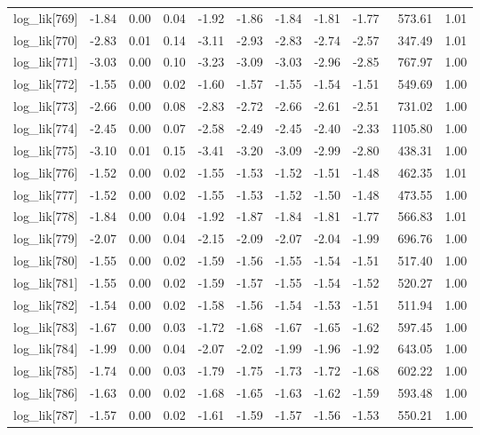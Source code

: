 \begin{table}[ht]
\begin{tabular}{rrrrrrrrrrr}
  log\_lik[769] & -1.84 & 0.00 & 0.04 & -1.92 & -1.86 & -1.84 & -1.81 & -1.77 & 573.61 & 1.01 \\ 
  log\_lik[770] & -2.83 & 0.01 & 0.14 & -3.11 & -2.93 & -2.83 & -2.74 & -2.57 & 347.49 & 1.01 \\ 
  log\_lik[771] & -3.03 & 0.00 & 0.10 & -3.23 & -3.09 & -3.03 & -2.96 & -2.85 & 767.97 & 1.00 \\ 
  log\_lik[772] & -1.55 & 0.00 & 0.02 & -1.60 & -1.57 & -1.55 & -1.54 & -1.51 & 549.69 & 1.00 \\ 
  log\_lik[773] & -2.66 & 0.00 & 0.08 & -2.83 & -2.72 & -2.66 & -2.61 & -2.51 & 731.02 & 1.00 \\ 
  log\_lik[774] & -2.45 & 0.00 & 0.07 & -2.58 & -2.49 & -2.45 & -2.40 & -2.33 & 1105.80 & 1.00 \\ 
  log\_lik[775] & -3.10 & 0.01 & 0.15 & -3.41 & -3.20 & -3.09 & -2.99 & -2.80 & 438.31 & 1.00 \\ 
  log\_lik[776] & -1.52 & 0.00 & 0.02 & -1.55 & -1.53 & -1.52 & -1.51 & -1.48 & 462.35 & 1.01 \\ 
  log\_lik[777] & -1.52 & 0.00 & 0.02 & -1.55 & -1.53 & -1.52 & -1.50 & -1.48 & 473.55 & 1.00 \\ 
  log\_lik[778] & -1.84 & 0.00 & 0.04 & -1.92 & -1.87 & -1.84 & -1.81 & -1.77 & 566.83 & 1.01 \\ 
  log\_lik[779] & -2.07 & 0.00 & 0.04 & -2.15 & -2.09 & -2.07 & -2.04 & -1.99 & 696.76 & 1.00 \\ 
  log\_lik[780] & -1.55 & 0.00 & 0.02 & -1.59 & -1.56 & -1.55 & -1.54 & -1.51 & 517.40 & 1.00 \\ 
  log\_lik[781] & -1.55 & 0.00 & 0.02 & -1.59 & -1.57 & -1.55 & -1.54 & -1.52 & 520.27 & 1.00 \\ 
  log\_lik[782] & -1.54 & 0.00 & 0.02 & -1.58 & -1.56 & -1.54 & -1.53 & -1.51 & 511.94 & 1.00 \\ 
  log\_lik[783] & -1.67 & 0.00 & 0.03 & -1.72 & -1.68 & -1.67 & -1.65 & -1.62 & 597.45 & 1.00 \\ 
  log\_lik[784] & -1.99 & 0.00 & 0.04 & -2.07 & -2.02 & -1.99 & -1.96 & -1.92 & 643.05 & 1.00 \\ 
  log\_lik[785] & -1.74 & 0.00 & 0.03 & -1.79 & -1.75 & -1.73 & -1.72 & -1.68 & 602.22 & 1.00 \\ 
  log\_lik[786] & -1.63 & 0.00 & 0.02 & -1.68 & -1.65 & -1.63 & -1.62 & -1.59 & 593.48 & 1.00 \\ 
  log\_lik[787] & -1.57 & 0.00 & 0.02 & -1.61 & -1.59 & -1.57 & -1.56 & -1.53 & 550.21 & 1.00 \\ 

\end{tabular}
\end{table}
